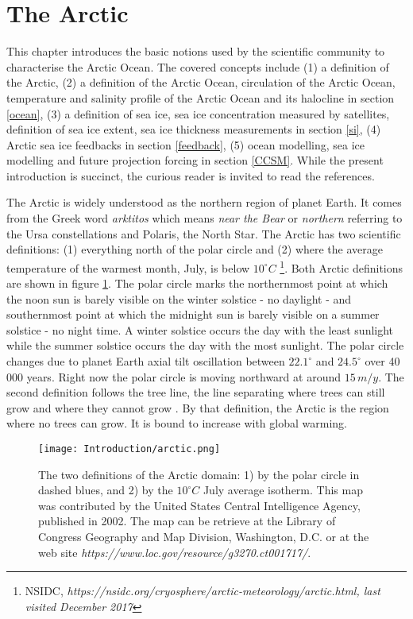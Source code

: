 \section{The Arctic}\label{thearctic}

This chapter introduces the basic notions used by the scientific community to characterise the Arctic Ocean. The covered concepts include (1) a definition of the Arctic, (2) a definition of the Arctic Ocean, circulation of the Arctic Ocean, temperature and salinity profile of the Arctic Ocean and its halocline in section \ref{ocean}, (3) a definition of sea ice, sea ice concentration measured by satellites, definition of sea ice extent, sea ice thickness measurements in section \ref{si}, (4) Arctic sea ice feedbacks in section \ref{feedback}, (5) ocean modelling, sea ice modelling and future projection forcing in section \ref{CCSM}. While the present introduction is succinct, the curious reader is invited to read the references.

The Arctic is widely understood as the northern region of planet Earth. It comes from the Greek word \textit{arktitos} which means \textit{near the Bear} or \textit{northern} referring to the Ursa constellations and Polaris, the North Star. The Arctic has two scientific definitions: (1) everything north of the polar circle and (2) where the average temperature of the warmest month, July, is below $10^\circ C$ \footnote{NSIDC, \textit{https://nsidc.org/cryosphere/arctic-meteorology/arctic.html, last visited December 2017}}. Both Arctic definitions are shown in figure \ref{arctic}. The polar circle marks the northernmost point at which the noon sun is barely visible on the winter solstice - no daylight - and southernmost point at which the midnight sun is barely visible on a summer solstice - no night time. A winter solstice occurs the day with the least sunlight while the summer solstice occurs the day with the most sunlight. The polar circle changes due to planet Earth axial tilt oscillation between $22.1^\circ$ and $24.5^\circ$ over 40 000 years. Right now the polar circle is moving northward at around $15\, m/y$. The second definition follows the tree line, the line separating where trees can still grow and where they cannot grow \citep{treeline}. By that definition, the Arctic is the region where no trees can grow. It is bound to increase with global warming. 

\begin{figure}
\center
\texttt{[image: Introduction/arctic.png]}
\caption{The two definitions of the Arctic domain: 1) by the polar circle in dashed blues, and 2) by the $10^\circ C$ July average isotherm. This map was contributed by the United States Central Intelligence Agency, published in 2002. The map can be retrieve at the Library of Congress Geography and Map Division, Washington, D.C. or at the web site \textit{https://www.loc.gov/resource/g3270.ct001717/}.}
\label{arctic}
\end{figure}


